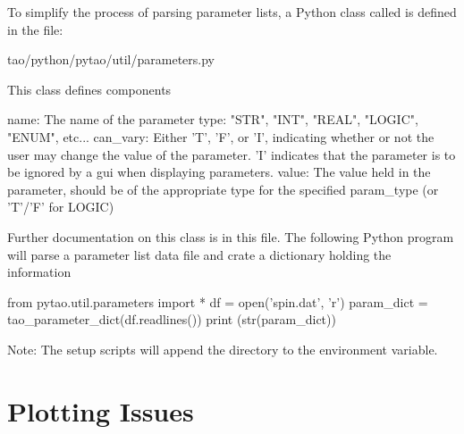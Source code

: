 To simplify the process of parsing parameter lists, a Python class called  is
defined in the file:
\begin{example}
  tao/python/pytao/util/parameters.py
\end{example}
This class defines components
\begin{example}
    name:       The name of the parameter
    type:       "STR", "INT", "REAL", "LOGIC", "ENUM", etc...
    can_vary:   Either 'T', 'F', or 'I', indicating whether or not the
                user may change the value of the parameter. 'I' indicates
                that the parameter is to be ignored by a gui when displaying parameters.
    value:      The value held in the parameter, should be of the
                appropriate type for the specified param_type
                (or 'T'/'F' for LOGIC)
\end{example}
Further documentation on this class is in this file. The following Python program will parse a parameter
list data file and crate a dictionary holding the information
\begin{example}
  from pytao.util.parameters import *
  df = open('spin.dat', 'r')
  param_dict = tao_parameter_dict(df.readlines())
  print (str(param_dict))
\end{example}
Note: The \bmad setup scripts will append the directory  to the 
environment variable.


\section{Plotting Issues}
\label{s:gui.plot}

